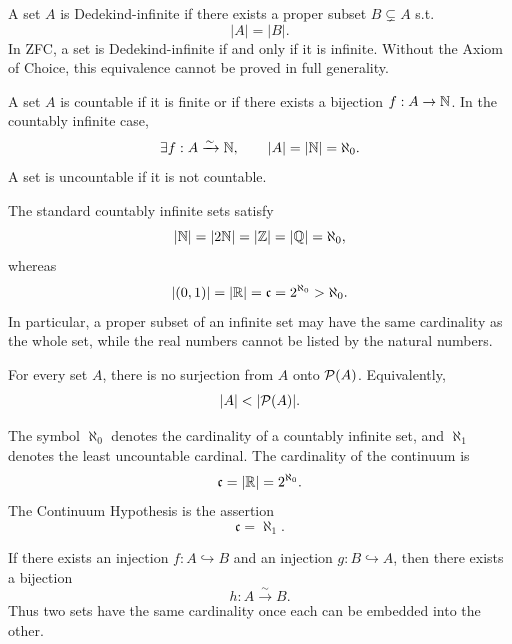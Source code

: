     \begin{definition}
        A set $A$ is Dedekind-infinite if there exists a proper subset
        $B\subsetneq A$ s.t.
        \[
            |A|=|B|.
        \]
        In ZFC, a set is Dedekind-infinite if and only if it is infinite. Without
        the Axiom of Choice, this equivalence cannot be proved in full
        generality.
    \end{definition}

    \begin{definition}[Countability]
        A set $A$ is countable if it is finite or if there exists a bijection
        $f:A\to\mathbb{N}$. In the countably infinite case,
        \[
            \exists f:A\xrightarrow{\sim}\mathbb{N},
            \qquad
            |A|=|\mathbb{N}|=\aleph_0.
        \]
        A set is uncountable if it is not countable.
    \end{definition}

    \begin{theorem}
        The standard countably infinite sets satisfy
        \[
            |\mathbb{N}|=|2\mathbb{N}|=|\mathbb{Z}|=|\mathbb{Q}|=\aleph_0,
        \]
        whereas
        \[
            |(0,1)|=|\mathbb{R}|=\mathfrak{c}=2^{\aleph_0}>\aleph_0.
        \]
        In particular, a proper subset of an infinite set may have the same
        cardinality as the whole set, while the real numbers cannot be listed by
        the natural numbers.
    \end{theorem}


    \begin{theorem}
        For every set $A$, there is no surjection from $A$ onto $\mathcal{P}(A)$.
        Equivalently,
        \[
            |A|<|\Pow(A)|.
        \]
    \end{theorem}

    \begin{definition}
        The symbol $\aleph_0$ denotes the cardinality of a countably infinite
        set, and $\aleph_1$ denotes the least uncountable cardinal. The
        cardinality of the continuum is
        \[
            \mathfrak{c}=|\mathbb{R}|=2^{\aleph_0}.
        \]
        The Continuum Hypothesis is the assertion
        \[
            \mathfrak{c}=\aleph_1.
        \]
    \end{definition}

    \begin{theorem}
        If there exists an injection $f:A\hookrightarrow B$ and an injection
        $g:B\hookrightarrow A$, then there exists a bijection
        \[
            h:A\xrightarrow{\sim}B.
        \]
        Thus two sets have the same cardinality once each can be embedded into
        the other.
    \end{theorem}

